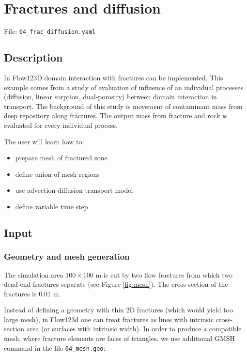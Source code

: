 \section{Fractures and diffusion}

File: \texttt{04\_frac\_diffusion.yaml}

\subsection{Description}

In Flow123D domain interaction with fractures can be implemented. This
example comes from a study of evaluation of influence of an individual
processes (diffusion, linear sorption, dual-porosity) between domain
interaction in transport. The background of this study is movement of
contaminant mass from deep repository along fractures. The output mass
from fracture and rock is evaluated for every individual process.

The user will learn how to:

\begin{itemize}
\tightlist
\item
  prepare mesh of fractured zone
\item
  define union of mesh regions
\item
  use advection-diffusion transport model
\item
  define variable time step
\end{itemize}

\subsection{Input}

\subsubsection{Geometry and mesh generation}

The simulation area \(100 \times 100\) m is cut by two flow fractures
from which two dead-end fractures separate (see Figure \ref{fig:mesh}).
The cross-section of the fractures is 0.01 m.

Instead of defining a geometry with thin 2D fractures (which would yield
too large mesh), in Flow123d one can treat fractures as lines with
intrinsic cross-section area (or surfaces with intrinsic width). In
order to produce a compatible mesh, where fracture elements are faces of
triangles, we use additional GMSH command in the file
\texttt{04\_mesh.geo}:

